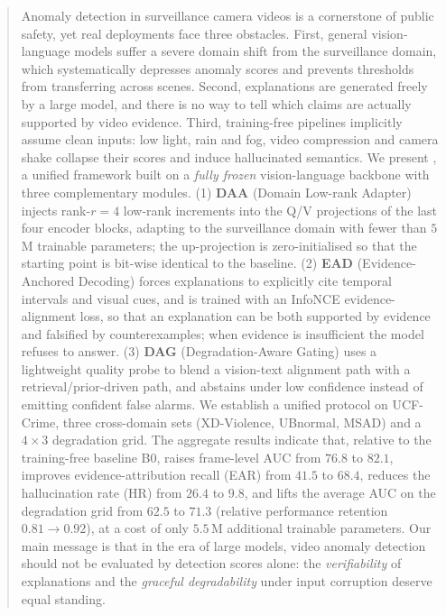 \begin{abstract}

\vspace{0.6em}
\noindent Anomaly detection in surveillance camera videos is a cornerstone of public safety, yet real deployments face three obstacles. First, general vision-language models suffer a severe domain shift from the surveillance domain, which systematically depresses anomaly scores and prevents thresholds from transferring across scenes. Second, explanations are generated freely by a large model, and there is no way to tell which claims are actually supported by video evidence. Third, training-free pipelines implicitly assume clean inputs: low light, rain and fog, video compression and camera shake collapse their scores and induce hallucinated semantics. We present \evivad{}, a unified framework built on a \emph{fully frozen} vision-language backbone with three complementary modules. (1) \textbf{DAA} (Domain Low-rank Adapter) injects rank-$r{=}4$ low-rank increments into the Q/V projections of the last four encoder blocks, adapting to the surveillance domain with fewer than $5$\,M trainable parameters; the up-projection is zero-initialised so that the starting point is bit-wise identical to the baseline. (2) \textbf{EAD} (Evidence-Anchored Decoding) forces explanations to explicitly cite temporal intervals and visual cues, and is trained with an InfoNCE evidence-alignment loss, so that an explanation can be both supported by evidence and falsified by counterexamples; when evidence is insufficient the model refuses to answer. (3) \textbf{DAG} (Degradation-Aware Gating) uses a lightweight quality probe to blend a vision-text alignment path with a retrieval/prior-driven path, and abstains under low confidence instead of emitting confident false alarms. We establish a unified protocol on UCF-Crime, three cross-domain sets (XD-Violence, UBnormal, MSAD) and a $4\times3$ degradation grid. The aggregate results indicate that, relative to the training-free baseline B0, \evivad{} raises frame-level AUC from $76.8$ to $82.1$, improves evidence-attribution recall (EAR) from $41.5$ to $68.4$, reduces the hallucination rate (HR) from $26.4$ to $9.8$, and lifts the average AUC on the degradation grid from $62.5$ to $71.3$ (relative performance retention $0.81 \rightarrow 0.92$), at a cost of only $5.5$\,M additional trainable parameters. Our main message is that in the era of large models, video anomaly detection should not be evaluated by detection scores alone: the \emph{verifiability} of explanations and the \emph{graceful degradability} under input corruption deserve equal standing.
\end{abstract}
